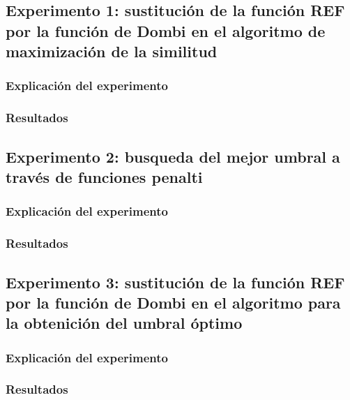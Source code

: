 \subsection{Experimento 1: sustitución de la función REF por la función de Dombi en el algoritmo de maximización de la similitud}

\subsubsection{Explicación del experimento}
\subsubsection{Resultados}

\subsection{Experimento 2: busqueda del mejor umbral a través de funciones penalti}

\subsubsection{Explicación del experimento}
\subsubsection{Resultados}

\subsection{Experimento 3: sustitución de la función REF por la función de Dombi en el algoritmo para la obtenición del umbral óptimo}

\subsubsection{Explicación del experimento}
\subsubsection{Resultados}